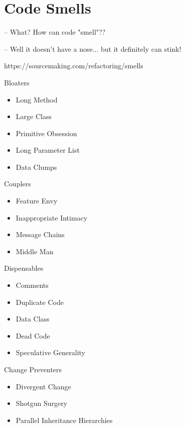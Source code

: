 \documentclass{beamer}
\begin{document}
\section{Code Smells}
\begin{frame}
    – What? How can code "smell"??

    – Well it doesn't have a nose... but it definitely can stink!

https://sourcemaking.com/refactoring/smells
\end{frame}

\begin{frame}{Bloaters}
\begin{itemize}
  \item Long Method
  \item Large Class
  \item Primitive Obsession
  \item Long Parameter List
  \item Data Clumps
\end{itemize}
\end{frame}

\begin{frame}{Couplers}
\begin{itemize}
  \item Feature Envy
  \item Inappropriate Intimacy
  \item Message Chains
  \item Middle Man
\end{itemize}
\end{frame}

\begin{frame}{Dispensables}
\begin{itemize}
  \item Comments
  \item Duplicate Code
  \item Data Class
  \item Dead Code
  \item Speculative Generality
\end{itemize}
\end{frame}

\begin{frame}{Change Preventers}
\begin{itemize}
  \item Divergent Change
  \item Shotgun Surgery
  \item Parallel Inheritance Hierarchies
\end{itemize}
\end{frame}
\end{document}
